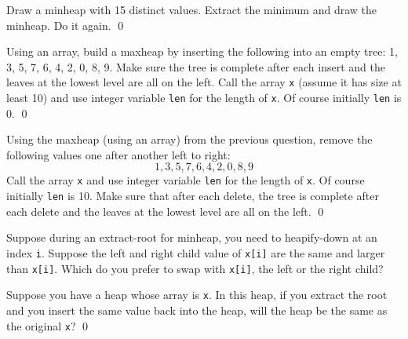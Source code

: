 \newpage
\begin{ex}
  Draw a minheap with 15 distinct values.
  Extract the minimum and draw the minheap.
  Do it again.
  \qed
\end{ex}





\begin{ex}
  Using an array, 
  build a maxheap by inserting the following into an empty tree:
  1, 3, 5, 7, 6, 4, 2, 0, 8, 9.
  Make sure the tree is complete after each insert and the leaves
  at the lowest level are all on the left.
  Call the array \texttt{x}
  (assume it has size at least 10)
  and use integer variable \texttt{len}
  for the length of \texttt{x}.
  Of course initially \texttt{len} is 0.
  \qed
\end{ex}

\begin{ex}
  Using the maxheap (using an array) from the previous question,
  remove the following values one after another left to right:
  \[
    1, 3, 5, 7, 6, 4, 2, 0, 8, 9
  \]
  Call the array \texttt{x} and use integer variable \texttt{len}
  for the length of \texttt{x}.
  Of course initially \texttt{len} is 10.
  Make sure that after each delete, the tree is complete after each delete and 
  the leaves
  at the lowest level are all on the left.
  \qed
\end{ex}

\begin{ex}
  Suppose during an extract-root for minheap,
  you need to heapify-down at an index \verb!i!.
  Suppose the left and right child value of \verb!x[i]! are the same and
  larger than \verb!x[i]!.
  Which do you prefer to swap with \verb!x[i]!, the left or the right
  child?
\end{ex}
%

\begin{ex}
  Suppose you have a heap whose array is \verb!x!.
  In this heap, if you extract the root and you insert the same value back
  into the heap, will the heap be the same as the original \verb!x!?
  \qed
\end{ex}
%
%
%

